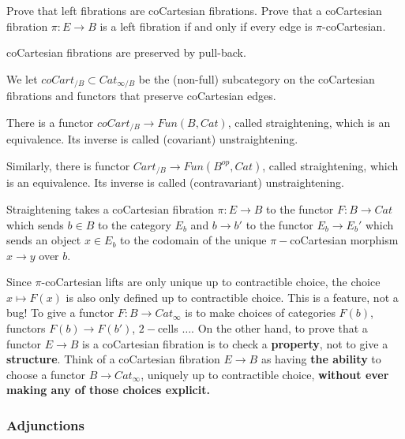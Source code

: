 \begin{exercise}
Prove that left fibrations are coCartesian fibrations. Prove that a coCartesian fibration $\pi:E\rightarrow B$ is a left fibration if and only if every edge is $\pi$-coCartesian.
\end{exercise}

\begin{prop}
    coCartesian fibrations are preserved by pull-back.
\end{prop}

\begin{definition}
We let $coCart_{/B}\subset Cat_{\infty/B}$ be the (non-full) subcategory on the coCartesian fibrations and functors that preserve coCartesian edges.
\end{definition}


\begin{theorem}
There is a functor $coCart_{/B}\rightarrow Fun(B,Cat)$, called straightening, which is an equivalence. Its inverse is called (covariant) unstraightening.

Similarly, there is functor $Cart_{/B}\rightarrow Fun(B^{op},Cat)$, called straightening, which is an equivalence. Its inverse is called (contravariant) unstraightening.
\end{theorem}

Straightening takes a coCartesian fibration $\pi:E\rightarrow B$ to the functor $F:B\rightarrow Cat$ which sends $b\in B$ to the category $E_b$ and $b\rightarrow b'$ to the functor $E_b\rightarrow E_b'$ which sends an object $x\in E_b$ to the codomain of the unique $\pi-$coCartesian morphism $x\rightarrow y$ over $b$.

Since $\pi$-coCartesian lifts are only unique up to contractible choice, the choice $x\mapsto F(x)$ is also only defined up to contractible choice. This is a feature, not a bug! To give a functor $F:B\rightarrow Cat_\infty$ is to make choices of categories $F(b)$, functors $F(b)\rightarrow F(b')$, $2-$cells $\dots.$ On the other hand, to prove that a functor $E\rightarrow B$ is a coCartesian fibration is to check a \textbf{property}, not to give a \textbf{structure}. Think of a coCartesian fibration $E\rightarrow B$ as having \textbf{the ability} to choose a functor $B\rightarrow Cat_\infty$, uniquely up to contractible choice, \textbf{without ever making any of those choices explicit.}

\subsubsection{Adjunctions}

